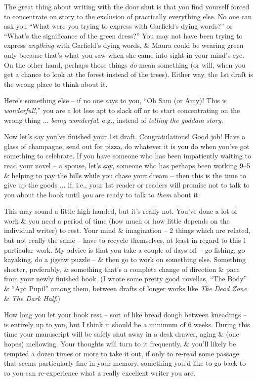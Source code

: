 \documentclass{article}
\numberwithin{equation}{section}
\begin{document}
The great thing about writing with the door shut is that you find yourself forced to concentrate on story to the exclusion of practically everything else. No one can ask you ``What were you trying to express with Garfield's dying words?'' or ``What's the significance of the green dress?'' You may not have been trying to express \textit{anything} with Garfield's dying words, \& Maura could be wearing green only because that's what you saw when she came into sight in your mind's eye. On the other hand, perhaps those things \textit{do} mean something (or will, when you get a chance to look at the forest instead of the trees). Either way, the 1st draft is the wrong place to think about it.

Here's something else -- if no one says to you, ``Oh Sam (or Amy)! This is \textit{wonderful!},'' you are a lot less apt to slack off or to start concentrating on the wrong thing $\ldots$ \textit{being wonderful}, e.g., instead of \textit{telling the goddam story}.

Now let's say you've finished your 1st draft. Congratulations! Good job! Have a glass of champagne, send out for pizza, do whatever it is you do when you've got something to celebrate. If you have someone who has been impatiently waiting to read your novel -- a spouse, let's say, someone who has perhaps been working 9--5 \& helping to pay the bills while you chase your dream -- then this is the time to give up the goods $\ldots$ if, i.e., your 1st reader or readers will promise not to talk to you about the book until \textit{you} are ready to talk to \textit{them} about it.

This may sound a little high-handed, but it's really not. You've done a lot of work \& you need a period of time (how much or how little depends on the individual writer) to rest. Your mind \& imagination -- 2 things which are related, but not really the same -- have to recycle themselves, at least in regard to this 1 particular work. My advice is that you take a couple of days off -- go fishing, go kayaking, do a jigsaw puzzle -- \& then go to work on something else. Something shorter, preferably, \& something that's a complete change of direction \& pace from your newly finished book. (I wrote some pretty good novellas, ``The Body'' \& ``Apt Pupil'' among them, between drafts of longer works like \textit{The Dead Zone} \& \textit{The Dark Half}.)

How long you let your book rest -- sort of like bread dough between kneadings -- is entirely up to you, but I think it should be a minimum of 6 weeks. During this time your manuscript will be safely shut away in a desk drawer, aging \& (one hopes) mellowing. Your thoughts will turn to it frequently, \& you'll likely be tempted a dozen times or more to take it out, if only to re-read some passage that seems particularly fine in your memory, something you'd like to go back to so you can re-experience what a really excellent writer you are.
\end{document}
